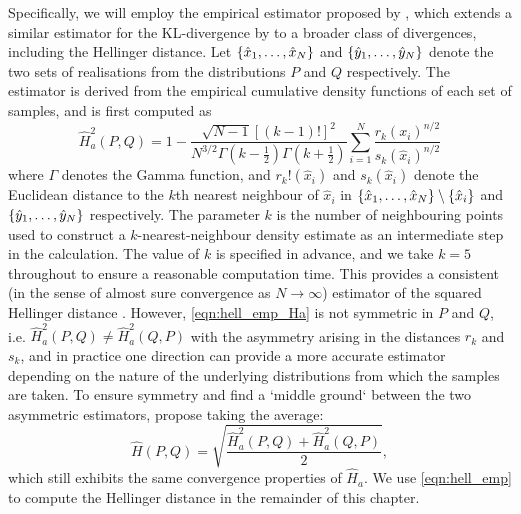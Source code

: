 Specifically, we will employ the empirical estimator proposed by \citet{DingMullhaupt_2023_EmpiricalSquaredHellinger}, which extends a similar estimator for the KL-divergence by \citet{Perez-Cruz_2008_KullbackLeiblerDivergenceEstimation} to a broader class of divergences, including the Hellinger distance.
Let \(\set{\hat{x}_1, \dotsc, \hat{x}_N}\) and \(\set{\hat{y}_1, \dotsc, \hat{y}_N}\) denote the two sets of realisations from the distributions \(P\) and \(Q\) respectively.
The estimator is derived from the empirical cumulative density functions of each set of samples, and is first computed as
\begin{equation}\label{eqn:hell_emp_Ha}
	\hat{H}_a^2\!\left(P,Q\right) = 1 - \frac{\sqrt{N - 1}\left[(k-1)!\right]^2}{N^{3/2}\Gamma\!\left(k - \frac12\right)\Gamma\!\left(k + \frac12\right)} \sum_{i=1}^{N}\frac{r_k\!\left(x_i\right)^{n/2}}{s_k\!\left(\hat{x}_i\right)^{n/2}}
\end{equation}
where \(\Gamma\) denotes the Gamma function, and \(r_k!\left(\hat{x}_i\right)\) and \(s_k\!\left(\hat{x}_i\right)\) denote the Euclidean distance to the \(k\)th nearest neighbour of \(\hat{x}_i\) in \(\set{\hat{x}_1, \dotsc, \hat{x}_N} \setminus \set{\hat{x}_i}\) and \(\set{\hat{y}_1, \dotsc, \hat{y}_N}\) respectively.
The parameter \(k\) is the number of neighbouring points used to construct a \(k\)-nearest-neighbour density estimate as an intermediate step in the calculation.
The value of \(k\) is specified in advance, and we take \(k = 5\) throughout to ensure a reasonable computation time.
This provides a consistent (in the sense of almost sure convergence as \(N \to \infty\)) estimator of the squared Hellinger distance \citep{DingMullhaupt_2023_EmpiricalSquaredHellinger}.
However, \cref{eqn:hell_emp_Ha} is not symmetric in \(P\) and \(Q\), i.e. \(\hat{H}_a^2\!\left(P,Q\right) \neq \hat{H}_a^2\!\left(Q,P\right)\) with the asymmetry arising in the distances \(r_k\) and \(s_k\), and in practice one direction can provide a more accurate estimator depending on the nature of the underlying distributions from which the samples are taken.
To ensure symmetry and find a `middle ground` between the two asymmetric estimators, \citet{DingMullhaupt_2023_EmpiricalSquaredHellinger} propose taking the average:
\begin{equation}\label{eqn:hell_emp}
	\hat{H}\!\left(P,Q\right) = \sqrt{\frac{\hat{H}_a^2\!\left(P,Q\right) + \hat{H}_a^2\!\left(Q,P\right)}{2}},
\end{equation}
which still exhibits the same convergence properties of \(\hat{H}_a\).
We use \cref{eqn:hell_emp} to compute the Hellinger distance in the remainder of this chapter.

